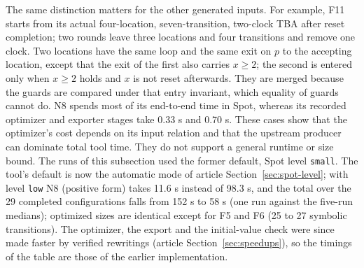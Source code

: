 The same distinction matters for the other generated inputs. For example,
F11 starts from its actual four-location, seven-transition, two-clock TBA
after reset completion; two rounds leave three locations and four
transitions and remove one clock. Two locations have the same loop and the
same exit on $p$ to the accepting location, except that the exit of the first
also carries $x\ge2$; the second is entered only when $x\ge2$ holds and $x$ is
not reset afterwards. They are merged because the guards are compared under
that entry invariant, which equality of guards cannot do. N8 spends most of its end-to-end time in Spot,
whereas its recorded optimizer and exporter stages take 0.33 s and 0.70 s.
These cases show that the optimizer's cost depends on its input relation and
that the upstream producer can dominate total tool time. They do not support
a general runtime or size bound. The runs of this subsection used the former default, Spot level \texttt{small}.
The tool's default is now the automatic mode of article Section~\ref{sec:spot-level};
with level \texttt{low} N8 (positive form) takes 11.6 s instead of 98.3 s, and
the total over the 29 completed configurations falls from 152 s to 58 s (one
run against the five-run medians); optimized sizes are identical except for F5
and F6 (25 to 27 symbolic transitions). The optimizer, the export and the
initial-value check were since made faster by verified rewritings
(article Section~\ref{sec:speedups}), so the timings of the table are those of the
earlier implementation.

